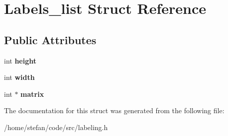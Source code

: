 \hypertarget{structLabels__list}{}\section{Labels\+\_\+list Struct Reference}
\label{structLabels__list}
\subsection*{Public Attributes}
\begin{DoxyCompactItemize}
\item 
\mbox{\label{structLabels__list_afd082a0f30245d44ac7d25d9f382dddd}} 
int {\bfseries height}
\item 
\mbox{\label{structLabels__list_affb759a5da6df75f62e4979617e326dd}} 
int {\bfseries width}
\item 
\mbox{\label{structLabels__list_a6500fd85b4e5d62aa1ad5221c6cc8674}} 
int $\ast$ {\bfseries matrix}
\end{DoxyCompactItemize}


The documentation for this struct was generated from the following file\+:\begin{DoxyCompactItemize}
\item 
/home/stefan/code/src/labeling.\+h\end{DoxyCompactItemize}
